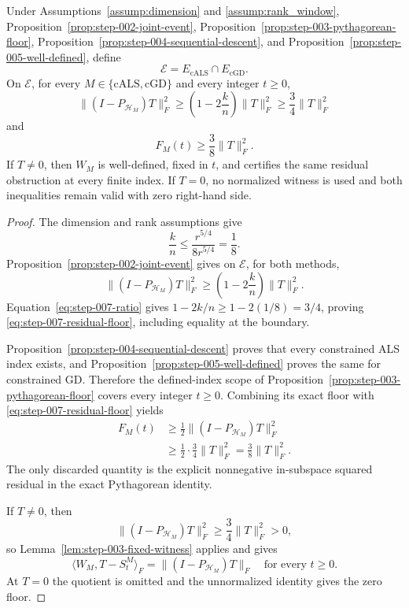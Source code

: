 \begin{proposition}\label{prop:step-007-joint-floor}
Under Assumptions~\ref{assump:dimension} and \ref{assump:rank_window},
Proposition~\ref{prop:step-002-joint-event},
Proposition~\ref{prop:step-003-pythagorean-floor},
Proposition~\ref{prop:step-004-sequential-descent}, and
Proposition~\ref{prop:step-005-well-defined}, define
\[
 \mathcal E=E_{\mathrm{cALS}}\cap E_{\mathrm{cGD}}.
\]
On $\mathcal E$, for every $M\in\{\mathrm{cALS},\mathrm{cGD}\}$ and every
integer $t\ge0$,
\[
 \|(I-P_{\mathcal H_M})T\|_F^2
 \ge\left(1-2\frac{k}{n}\right)\|T\|_F^2
 \ge\frac34\|T\|_F^2
 \tag{A.15}\label{eq:step-007-residual-floor}
\]
and
\[
 F_M(t)\ge\frac38\|T\|_F^2.
 \tag{A.16}\label{eq:step-007-objective-floor}
\]
If $T\ne0$, then $W_M$ is well-defined, fixed in $t$, and certifies the same
residual obstruction at every finite index.  If $T=0$, no normalized witness
is used and both inequalities remain valid with zero right-hand side.
\end{proposition}

\begin{proof}
The dimension and rank assumptions give
\[
 \frac{k}{n}\le\frac{r^{5/4}}{8r^{5/4}}=\frac18.
 \tag{A.17}\label{eq:step-007-ratio}
\]
Proposition~\ref{prop:step-002-joint-event} gives on $\mathcal E$, for both
methods,
\[
 \|(I-P_{\mathcal H_M})T\|_F^2
 \ge\left(1-2\frac{k}{n}\right)\|T\|_F^2.
\]
Equation~\eqref{eq:step-007-ratio} gives
$1-2k/n\ge1-2(1/8)=3/4$, proving
\eqref{eq:step-007-residual-floor}, including equality at the boundary.

Proposition~\ref{prop:step-004-sequential-descent} proves that every
constrained ALS index exists, and
Proposition~\ref{prop:step-005-well-defined} proves the same for constrained
GD.  Therefore the defined-index scope of
Proposition~\ref{prop:step-003-pythagorean-floor} covers every integer
$t\ge0$.  Combining its exact floor with
\eqref{eq:step-007-residual-floor} yields
\[
 \begin{aligned}
 F_M(t)
 &\ge\frac12\|(I-P_{\mathcal H_M})T\|_F^2\\
 &\ge\frac12\cdot\frac34\|T\|_F^2
 =\frac38\|T\|_F^2.
 \end{aligned}
\]
The only discarded quantity is the explicit nonnegative in-subspace squared
residual in the exact Pythagorean identity.

If $T\ne0$, then
\[
 \|(I-P_{\mathcal H_M})T\|_F^2
 \ge\frac34\|T\|_F^2>0,
\]
so Lemma~\ref{lem:step-003-fixed-witness} applies and gives
\[
 \langle W_M,T-S_t^M\rangle_F
 =\|(I-P_{\mathcal H_M})T\|_F
 \quad\text{for every }t\ge0.
\]
At $T=0$ the quotient is omitted and the unnormalized identity gives the
zero floor.
\end{proof}

